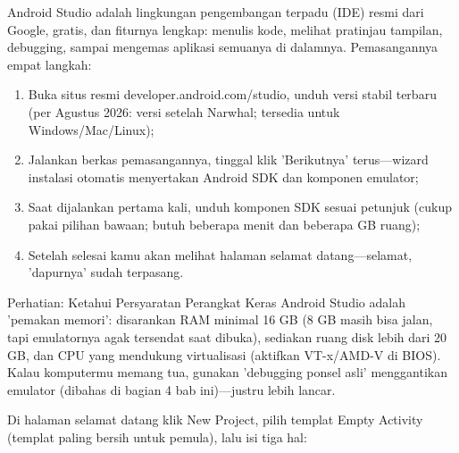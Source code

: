 


Android Studio adalah lingkungan pengembangan terpadu (IDE) resmi dari Google, gratis, dan fiturnya lengkap: menulis kode, melihat pratinjau tampilan, debugging, sampai mengemas aplikasi semuanya di dalamnya. Pemasangannya empat langkah:

\begin{enumerate}
  \item Buka situs resmi developer.android.com/studio, unduh versi stabil terbaru (per Agustus 2026: versi setelah Narwhal; tersedia untuk Windows/Mac/Linux);
  \item Jalankan berkas pemasangannya, tinggal klik 'Berikutnya' terus—wizard instalasi otomatis menyertakan Android SDK dan komponen emulator;
  \item Saat dijalankan pertama kali, unduh komponen SDK sesuai petunjuk (cukup pakai pilihan bawaan; butuh beberapa menit dan beberapa GB ruang);
  \item Setelah selesai kamu akan melihat halaman selamat datang—selamat, 'dapurnya' sudah terpasang.
\end{enumerate}

\begin{tcbwarn}{Perhatian: Ketahui Persyaratan Perangkat Keras}
Android Studio adalah 'pemakan memori': disarankan RAM minimal 16 GB (8 GB masih bisa jalan, tapi emulatornya agak tersendat saat dibuka), sediakan ruang disk lebih dari 20 GB, dan CPU yang mendukung virtualisasi (aktifkan VT-x/AMD-V di BIOS). Kalau komputermu memang tua, gunakan 'debugging ponsel asli' menggantikan emulator (dibahas di bagian 4 bab ini)—justru lebih lancar.

\end{tcbwarn}


Di halaman selamat datang klik New Project, pilih templat Empty Activity (templat paling bersih untuk pemula), lalu isi tiga hal:

